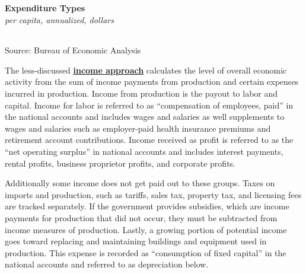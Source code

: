 \documentclass{report}
\begin{document}
\vspace{3mm}

\begin{minipage}{0.77\textwidth}
\normalsize \textbf{Expenditure Types}\\
\footnotesize{\textit{per capita, annualized, dollars}}\\
\hspace{-2mm}  \setlength{\tabcolsep}{3.7pt} \color{black!90}
		{\renewcommand{\arraystretch}{1.55}
		 \begin{tabular}{p{53mm} R{13mm} R{13mm} R{13mm} R{13mm}}
			 \hline
		\end{tabular}} \vspace{-2mm}
		
\footnotesize{Source: Bureau of Economic Analysis}
\end{minipage}
\newpage
\begin{minipage}{0.76\textwidth}
\small The less-discussed \textbf{\href{https://www.bea.gov/help/glossary/income-approach}{income approach}} calculates the level of overall economic activity from the sum of income payments from production and certain expenses incurred in production. Income from production is the payout to labor and capital. Income for labor is referred to as ``compensation of employees, paid'' in the national accounts and includes wages and salaries as well supplements to wages and salaries such as employer-paid health insurance premiums and retirement account contributions. Income received as profit is referred to as the ``net operating surplus'' in national accounts and includes interest payments, rental profits, business proprietor profits, and corporate profits.

Additionally some income does not get paid out to these groups. Taxes on imports and production, such as tariffs, sales tax, property tax, and licensing fees are tracked separately. If the government provides subsidies, which are income payments for production that did not occur, they must be subtracted from income measures of production. Lastly, a growing portion of potential income goes toward replacing and maintaining buildings and equipment used in production. This expense is recorded as ``consumption of fixed capital'' in the national accounts and referred to as depreciation below.


\end{minipage}
\vspace{1mm}
\end{document}
